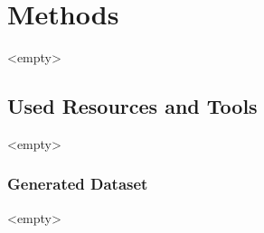 \section{Methods}
<empty>

\subsection{Used Resources and Tools}
<empty>

\subsubsection{Generated Dataset}
<empty>